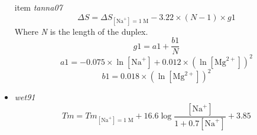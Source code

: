 \documentclass{article}
\begin{document}
\begin{itemize}
\begin{displaymath}
 \end{displaymath}
 item \textit{tanna07}
 \begin{displaymath}
  \Delta{}S=\Delta{}S_{[\mbox{Na}^+]=1\;\mathrm{M}}- 3.22 \times (N - 1) \times g1  
 \end{displaymath}
 Where \emph{N} is the length of the duplex.
 \begin{displaymath}
  g1=a1 + \frac{b1}{N}  
 \end{displaymath}
 \begin{displaymath}
  a1= -0.075 \times \ln [\mbox{Na}^+] + 0.012 \times (\ln [\mbox{Mg}^{2+}])^2  
 \end{displaymath}
 \begin{displaymath}
  b1= 0.018 \times (\ln [\mbox{Mg}^{2+}])^2  
 \end{displaymath}
 \item \textit{wet91}
 \begin{displaymath}
  Tm=Tm_{[\mbox{Na}^+]=1\;\mathrm{M}}+ 16.6  \log \frac{[\mbox{Na}^+]}{1 + 0.7 [\mbox{Na}^+]} + 3.85    
 \end{displaymath}
 \end{itemize}
 
\end{document}

